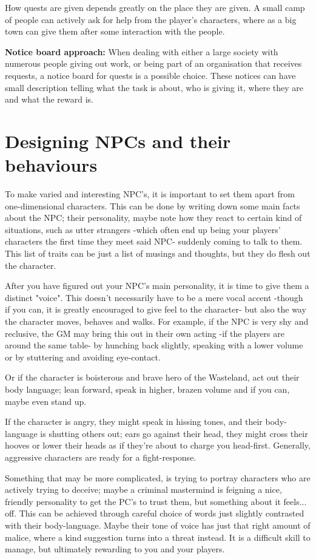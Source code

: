 \documentclass[11pt,a4paper,twocolumn]{book}
\begin{document}
    How quests are given depends greatly on the place they are given. A small camp of people can actively ask for help from the player's characters, where as a big town can give them after some interaction with the people.
    
    \textbf{Notice board approach:} When dealing with either a large society with numerous people giving out work, or being part of an organisation that receives requests, a notice board for quests is a possible choice. These notices can have small description telling what the task is about, who is giving it, where they are and what the reward is. 
    
    \section*{Designing NPCs and their behaviours}
    To make varied and interesting NPC's, it is important to set them apart from one-dimensional characters. This can be done by writing down some main facts about the NPC; their personality, maybe note how they react to certain kind of situations, such as utter strangers -which often end up being your players' characters the first time they meet said NPC- suddenly coming to talk to them. This list of traits can be just a list of musings and thoughts, but they do flesh out the character.
    
    After you have figured out your NPC's main personality, it is time to give them a distinct "voice". This doesn't necessarily have to be a mere vocal accent -though if you can, it is greatly encouraged to give feel to the character- but also the way the character moves, behaves and walks. For example, if the NPC is very shy and reclusive, the GM may bring this out in their own acting -if the players are around the same table- by hunching back slightly, speaking with a lower volume or by stuttering and avoiding eye-contact. 
 
    Or if the character is boisterous and brave hero of the Wasteland, act out their body language; lean forward, speak in higher, brazen volume and if you can, maybe even stand up. 
    
    If the character is angry, they might speak in hissing tones, and their body-language is shutting others out; ears go against their head, they might cross their hooves or lower their heads as if they're about to charge you head-first. Generally, aggressive characters are ready for a fight-response.
    
    Something that may be more complicated, is trying to portray characters who are actively trying to deceive; maybe a criminal mastermind is feigning a nice, friendly personality to get the PC's to trust them, but something about it feels... off. This can be achieved through careful choice of words just slightly contrasted with their body-language. Maybe their tone of voice has just that right amount of malice, where a kind suggestion turns into a threat instead. It is a difficult skill to manage, but ultimately rewarding to you and your players.
    
\end{document}
